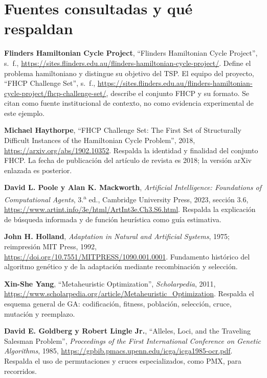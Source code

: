 \documentclass[11pt,letterpaper]{article}
\begin{document}
\section{Fuentes consultadas y qué respaldan}
\begingroup\small
\begin{enumerate}[leftmargin=*,label={[\arabic*]},itemsep=3pt]
\item \textbf{Flinders Hamiltonian Cycle Project}, ``Flinders Hamiltonian Cycle Project'', s.~f., \url{https://sites.flinders.edu.au/flinders-hamiltonian-cycle-project/}. Define el problema hamiltoniano y distingue su objetivo del TSP. El equipo del proyecto, ``FHCP Challenge Set'', s.~f., \url{https://sites.flinders.edu.au/flinders-hamiltonian-cycle-project/fhcp-challenge-set/}, describe el conjunto FHCP y su formato. Se citan como fuente institucional de contexto, no como evidencia experimental de este ejemplo.
\item \textbf{Michael Haythorpe}, ``FHCP Challenge Set: The First Set of Structurally Difficult Instances of the Hamiltonian Cycle Problem'', 2018, \url{https://arxiv.org/abs/1902.10352}. Respalda la identidad y finalidad del conjunto FHCP. La fecha de publicación del artículo de revista es 2018; la versión arXiv enlazada es posterior.
\item \textbf{David L. Poole y Alan K. Mackworth}, \emph{Artificial Intelligence: Foundations of Computational Agents}, 3.\textsuperscript{a} ed., Cambridge University Press, 2023, sección 3.6, \url{https://www.artint.info/3e/html/ArtInt3e.Ch3.S6.html}. Respalda la explicación de búsqueda informada y de función heurística como guía estimativa.
\item \textbf{John H. Holland}, \emph{Adaptation in Natural and Artificial Systems}, 1975; reimpresión MIT Press, 1992, \url{https://doi.org/10.7551/MITPRESS/1090.001.0001}. Fundamento histórico del algoritmo genético y de la adaptación mediante recombinación y selección.
\item \textbf{Xin-She Yang}, ``Metaheuristic Optimization'', \emph{Scholarpedia}, 2011, \url{https://www.scholarpedia.org/article/Metaheuristic_Optimization}. Respalda el esquema general de GA: codificación, fitness, población, selección, cruce, mutación y reemplazo.
\item \textbf{David E. Goldberg y Robert Lingle Jr.}, ``Alleles, Loci, and the Traveling Salesman Problem'', \emph{Proceedings of the First International Conference on Genetic Algorithms}, 1985, \url{https://gpbib.pmacs.upenn.edu/icga/icga1985-ocr.pdf}. Respalda el uso de permutaciones y cruces especializados, como PMX, para recorridos.

\end{enumerate}
\end{document}
